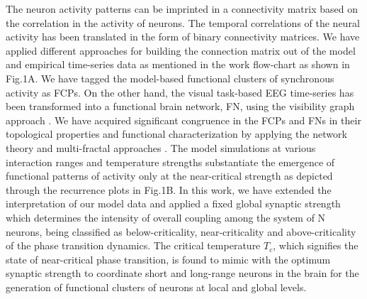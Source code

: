 \documentclass[preprintnumbers,amsmath,amssymb,onecolumn]{revtex4}
\begin{document}
{\noindent}The neuron activity patterns can be imprinted in a connectivity matrix based on the correlation in the activity of neurons. The temporal correlations of the neural activity has been translated in the form of binary connectivity matrices. We have applied different approaches for building the connection matrix out of the model and empirical time-series data as mentioned in the work flow-chart as shown in Fig.1A. We have tagged the model-based functional clusters of synchronous activity as FCPs. On the other hand, the visual task-based EEG time-series has been transformed into a functional brain network, FN, using the visibility graph approach \citep{Lacasa2008}. We have acquired significant congruence in the FCPs and FNs in their topological properties and functional characterization by applying the network theory and multi-fractal approaches \citep{Sporns2002a,Kantelhardt2002}. The model simulations at various interaction ranges and temperature strengths substantiate the emergence of functional patterns of activity only at the near-critical strength as depicted through the recurrence plots in Fig.1B. In this work, we have extended the interpretation of our model data and applied a fixed global synaptic strength which determines the intensity of overall coupling among the system of N neurons, being classified as below-criticality, near-criticality and above-criticality of the phase transition dynamics. The critical temperature $T_{c}$, which signifies the state of near-critical phase transition, is found to mimic with the optimum synaptic strength to coordinate short and long-range neurons in the brain for the generation of functional clusters of neurons at local and global levels.\\
\end{document}
